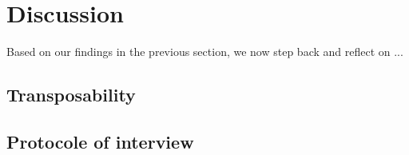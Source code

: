 \section{Discussion}
\label{discussion}

Based on our findings in the previous section, we now step back and reﬂect on ...

\subsection{Transposability}

\subsection{Protocole of interview}